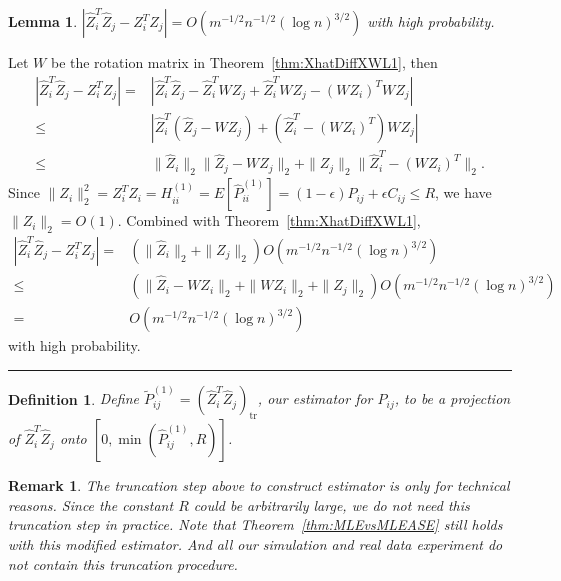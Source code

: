 \documentclass[a4paper]{article}
\newenvironment{proof}{{\bf Proof:  }}{\hfill\rule{2mm}{2mm}}
\newtheorem{lemma}[fact]{Lemma}
\newtheorem{definition}[fact]{Definition}
\newtheorem{remark}[fact]{Remark}
\renewcommand{\hat}{\widehat}
\begin{document}
\begin{lemma}
\label{lemma:1stMomentPhatDiffL1}
$\left|  \hat{Z}_i^T \hat{Z}_j - Z_i^T Z_j \right| = O(m^{-1/2} n^{-1/2} (\log n)^{3/2})$ with high probability.
\end{lemma}
\begin{proof}
Let $W$ be the rotation matrix in Theorem~\ref{thm:XhatDiffXWL1}, then
\begin{align*}
	\left|  \hat{Z}_i^T \hat{Z}_j - Z_i^T Z_j \right|
    = & \left| \hat{Z}_i^T \hat{Z}_j - \hat{Z}_i^T W Z_j + \hat{Z}_i^T W Z_j - (W Z_i)^T W Z_j \right| \\
    \le & \left| \hat{Z}_i^T (\hat{Z}_j - W Z_j) + (\hat{Z}_i^T - (W Z_i)^T) W Z_j \right| \\
    \le & \|\hat{Z}_i\|_2 \|\hat{Z}_j - W Z_j\|_2 + \|Z_j\|_2 \|\hat{Z}_i^T - (W Z_i)^T\|_2.
\end{align*}
Since $\|Z_i\|_2^2 = Z_i^T Z_i = H^{(1)}_{ii} =  E[\hat{P}^{(1)}_{ii}] = (1-\epsilon) P_{ij} + \epsilon C_{ij} \le R$, we have $\|Z_i\|_2 = O(1)$.
Combined with Theorem~\ref{thm:XhatDiffXWL1},
\begin{align*}
    \left|  \hat{Z}_i^T \hat{Z}_j - Z_i^T Z_j \right|
    = & (\|\hat{Z}_i\|_2 + \|Z_j\|_2) O(m^{-1/2} n^{-1/2} (\log n)^{3/2}) \\
    \le & (\|\hat{Z}_i - W Z_i\|_2 + \|W Z_i\|_2 + \|Z_j\|_2) O(m^{-1/2} n^{-1/2} (\log n)^{3/2}) \\
    = & O(m^{-1/2} n^{-1/2} (\log n)^{3/2})
\end{align*}
with high probability.
\end{proof}

\begin{definition}
\label{def:truncationMLE}
Define $\widetilde{P}_{ij}^{(1)} = (\hat{Z}_i^T \hat{Z}_j)_{\mathrm{tr}}$, our estimator for $P_{ij}$, to be a projection of $\hat{Z}_i^T \hat{Z}_j$ onto $[0, \min(\hat{P}_{ij}^{(1)}, R)]$.
\end{definition}

\begin{remark}
\label{remark:truncation}
The truncation step above to construct estimator is only for technical reasons. Since the constant $R$ could be arbitrarily large, we do not need this truncation step in practice. Note that Theorem~\ref{thm:MLEvsMLEASE} still holds with this modified estimator. And all our simulation and real data experiment do not contain this truncation procedure.
\end{remark}
\end{document}

